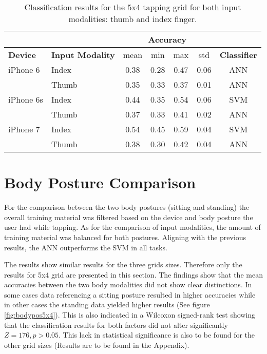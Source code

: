 \begin{table}[h!]
  \centering
\begin{tabular}{|l|l|c|c|c|c|c|}
  \cline{3-6}
  \multicolumn{2}{c}{} & \multicolumn{4}{|c|}{\textbf{Accuracy}}  \\
  \hline
  \textbf{Device} & \textbf{Input Modality} & mean &   min &   max  & std &  \textbf{Classifier} \\
  \hline
  iPhone 6 & Index &      0.38 &     0.28 &     0.47 &     0.06 &  ANN \\
  & Thumb &      0.35 &     0.33 &     0.37 &     0.01 &  ANN \\
  \hline
iPhone 6s & Index &      0.44 &     0.35 &     0.54 &     0.06 &  SVM \\
  & Thumb &      0.37 &     0.33 &     0.41 &     0.02 &  ANN \\
  \hline
  iPhone 7 & Index &      0.54 &     0.45 &     0.59 &     0.04 &  SVM \\
  & Thumb &      0.38 &     0.30 &     0.42 &     0.04 &  ANN \\
  \hline
\end{tabular}
  \caption{Classification results for the 5x4 tapping grid for both input modalities: thumb and index finger.}
\end{table}

\section{Body Posture Comparison}
For the comparison between the two body postures (sitting and standing) the overall training material was filtered based on the device and body posture the user had while tapping. As for the comparison of input modalities, the amount of training material was balanced for both postures. Aligning with the previous results, the ANN outperforms the SVM in all tasks.

The results show similar results for the three grids sizes. Therefore only the results for 5x4 grid are presented in this section. The findings show that the mean accuracies between the two body modalities did not show clear distinctions. In some cases data referencing a sitting posture resulted in higher accuracies while in other cases the standing data yielded higher results (See figure \ref{fig:bodypos5x4}). This is also indicated in a Wilcoxon signed-rank test showing that the classification results for both factors did not alter significantly $Z = 176, p > 0.05$. This lack in statistical significance is also to be found for the other grid sizes (Results are to be found in the Appendix).

